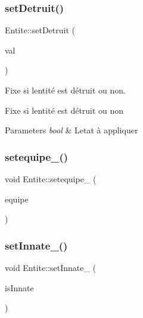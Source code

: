 \mbox{\label{class_entite_a4b0ce40a2427f44978728dbae9560fee}} 
\subsubsection{\texorpdfstring{set\+Detruit()}{setDetruit()}}
{\footnotesize\ttfamily Entite\+::set\+Detruit (\begin{DoxyParamCaption}\item[{bool}]{val }\end{DoxyParamCaption})}



Fixe si l\textquotesingle{}entité est détruit ou non. 

Fixe si l\textquotesingle{}entité est détruit ou non 
\begin{DoxyParams}{Parameters}
{\em bool} & L\textquotesingle{}etat à appliquer \\
\hline
\end{DoxyParams}
\mbox{\label{class_entite_ac5e59154ac3eb3f131d9ed7f2c84d7a8}} 
\subsubsection{\texorpdfstring{setequipe\+\_\+()}{setequipe\_()}}
{\footnotesize\ttfamily void Entite\+::setequipe\+\_\+ (\begin{DoxyParamCaption}\item[{\mbox{\hyperlink{constantes_8h_a08fa5554288d5031a8f3bb83cc04ee83}{Equipe}}}]{equipe }\end{DoxyParamCaption})\hspace{0.3cm}{\ttfamily [inline]}}

\mbox{\label{class_entite_a43a21ff043627fb6737aeb2a4f3e4986}} 
\subsubsection{\texorpdfstring{set\+Innate\+\_\+()}{setInnate\_()}}
{\footnotesize\ttfamily void Entite\+::set\+Innate\+\_\+ (\begin{DoxyParamCaption}\item[{const bool \&}]{is\+Innate }\end{DoxyParamCaption})\hspace{0.3cm}{\ttfamily [inline]}}


